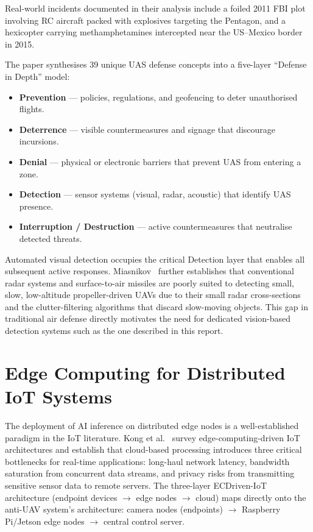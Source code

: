 \documentclass[12pt,a4paper]{report}
\begin{document}
Real-world incidents documented in their analysis include a foiled 2011 FBI plot
involving RC aircraft packed with explosives targeting the Pentagon, and a hexicopter
carrying methamphetamines intercepted near the US--Mexico border in 2015.

The paper synthesises 39 unique UAS defense concepts into a five-layer
``Defense in Depth'' model:

\begin{itemize}
  \item \textbf{Prevention} --- policies, regulations, and geofencing to deter unauthorised flights.
  \item \textbf{Deterrence} --- visible countermeasures and signage that discourage incursions.
  \item \textbf{Denial} --- physical or electronic barriers that prevent UAS from entering a zone.
  \item \textbf{Detection} --- sensor systems (visual, radar, acoustic) that identify UAS presence.
  \item \textbf{Interruption / Destruction} --- active countermeasures that neutralise detected threats.
\end{itemize}

Automated visual detection occupies the critical Detection layer that enables all
subsequent active responses. Miasnikov~\cite{miasnikov2005uav} further establishes
that conventional radar systems and surface-to-air missiles are poorly suited to
detecting small, slow, low-altitude propeller-driven UAVs due to their small radar
cross-sections and the clutter-filtering algorithms that discard slow-moving objects.
This gap in traditional air defense directly motivates the need for dedicated
vision-based detection systems such as the one described in this report.

\section{Edge Computing for Distributed IoT Systems}

The deployment of AI inference on distributed edge nodes is a well-established
paradigm in the IoT literature. Kong et al.~\cite{kong2022edge} survey
edge-computing-driven IoT architectures and establish that cloud-based
processing introduces three critical bottlenecks for real-time applications:
long-haul network latency, bandwidth saturation from concurrent data streams,
and privacy risks from transmitting sensitive sensor data to remote servers.
The three-layer ECDriven-IoT architecture (endpoint devices $\to$ edge nodes
$\to$ cloud) maps directly onto the anti-UAV system's architecture: camera
nodes (endpoints) $\to$ Raspberry Pi/Jetson edge nodes $\to$ central control
server.
\end{document}
